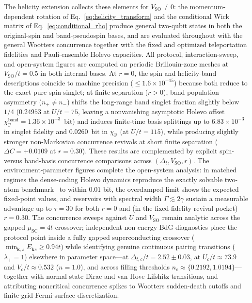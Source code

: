 \documentclass[aps,prb,twocolumn,superscriptaddress,longbibliography]{revtex4-2}
\begin{document}
The helicity extension collects these elements for
$V_{\mathrm{SO}}\neq0$: the momentum-dependent rotation of
Eq.~\eqref{eq:helicity_transform} and the conditional Wick matrix of
Eq.~\eqref{eq:conditional_rho} produce general two-qubit states in both
the original-spin and band-pseudospin bases, and are evaluated
throughout with the general Wootters concurrence together with the
fixed and optimized teleportation fidelities and Pauli-ensemble Holevo
capacities. All protocol, interaction-sweep, and open-system figures are
computed on periodic Brillouin-zone meshes at $V_{\mathrm{SO}}/t=0.5$ in
both internal bases. At $r=0$, the spin and helicity-band descriptions
coincide to machine precision ($\le 1.6\times10^{-15}$) because both reduce
to the exact pure spin singlet; at finite separation ($r>0$),
band-population asymmetry ($n_+\neq n_-$) shifts the long-range band
singlet fraction slightly below $1/4$ ($0.24953$ at $U/t=75$, leaving a
nonvanishing asymptotic Holevo offset $\chi_{\mathrm{P}}^{\mathrm{band}}=1.36\times10^{-3}$~bit)
and induces finite-time basis splittings up to $6.83\times10^{-3}$ in
singlet fidelity and $0.0260$~bit in $\chi_{\mathrm{P}}$ (at $U/t=115$),
while producing slightly stronger non-Markovian concurrence revivals at
short finite separation ($\Delta C=+0.0109$ at $r=0.30$). These results
are complemented by explicit spin- versus band-basis concurrence comparisons
across $(\Delta_t,V_{\mathrm{SO}},r)$.
The environment-parameter
figures complete the open-system analysis: in matched regimes the
dense-coding Holevo dynamics reproduce the exactly solvable two-atom
benchmark~\cite{Haddadi2023} to within $0.01$ bit, the overdamped limit
shows the expected fixed-point values, and reservoirs with spectral
width $\Gamma\lesssim2\gamma$ sustain a measurable advantage up to
$\tau=30$ for both $r=0$ and (in the fixed-fidelity revival pocket) $r=0.30$.
The concurrence sweeps against $U$ and $V_{\mathrm{SO}}$
remain analytic across the gapped $\mu_{\mathrm{SC}}=4t$ crossover;
independent non-energy BdG diagnostics place the protocol point inside a
fully gapped superconducting crossover ($\min_{\mathbf{k},s}E_{\mathbf{k}s}\ge 0.94t$)
while identifying genuine continuous pairing transitions ($\lambda_+=1$)
elsewhere in parameter space---at $\Delta_{t,c}/t=2.52\pm0.03$, at
$U_c/t\approx 73.9$ and $V_c/t\approx 0.532$ ($n=1.0$), and across
filling thresholds $n_c\approx \{0.2192, 1.0194\}$---together with
normal-state Dirac and van Hove Lifshitz transitions, and attributing
noncritical concurrence spikes to Wootters sudden-death cutoffs and
finite-grid Fermi-surface discretization.
\end{document}
